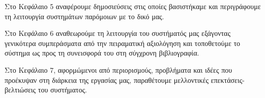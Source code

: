 Στο Κεφάλαιο 5 αναφέρουμε δημοσιεύσεις στις οποίες βασιστήκαμε και περιγράφουμε τη λειτουργία συστημάτων παρόμοιων με το δικό μας.

Στο Κεφάλαιο 6 αναθεωρούμε τη λειτουργία του συστήματός μας εξάγοντας γενικότερα συμπεράσματα από την πειραματική αξιολόγηση και τοποθετούμε το σύστημα ως προς τη συνεισφορά του στη σύγχρονη βιβλιογραφία.

Στο Κεφάλαιο 7, αφορμώμενοι από περιορισμούς, προβλήματα και ιδέες που προέκυψαν στη διάρκεια της εργασίας μας, παραθέτουμε μελλοντικές επεκτάσεις-βελτιώσεις του συστήματος. 


